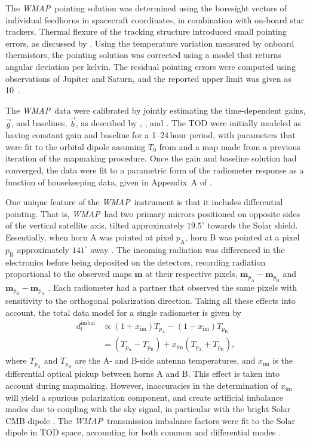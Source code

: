 \documentclass[twocolumn]{../../common/aa}
\def\WMAP{\emph{WMAP}}
\newcommand{\A}[0]{\mathrm{A}}
\newcommand{\B}[0]{\mathrm{B}}
\newcommand{\bv}[0]{\vec{b}}
\newcommand{\g}[0]{\vec{g}}
\begin{document}
The \WMAP\ pointing solution was determined using the boresight vectors of individual feedhorns in spacecraft coordinates, in combination with on-board star trackers. Thermal flexure of the tracking structure introduced small pointing errors, as discussed by \citet{jarosik2007}. Using the temperature variation measured by onboard thermistors, the pointing solution was corrected using a model that returns angular deviation per kelvin. The residual pointing errors were computed using observations of Jupiter and Saturn, and the reported upper limit was given as 10\arcsec\ \citep{wmapexsupp,bennett2012}.

The \WMAP\ data were calibrated by jointly estimating the time-dependent gains, $\g$, and baselines, $\bv$, as described by \citet{hinshaw2007}, \citet{hinshaw2009}, and \citet{jarosik2010}.
The TOD were initially modeled as having
constant gain and baseline for a 1--24\,hour period, with parameters that were fit to the orbital
dipole assuming $T_0$ from \citet{mather:1999} and a map made from a previous
iteration of the mapmaking procedure. Once the gain and baseline solution had
converged, the data were fit to a parametric form of the radiometer response
as a function of housekeeping data, given in Appendix~A of \citet{wmapexsupp}.

One unique feature of the \WMAP\ instrument is that it includes differential pointing. That is, \WMAP\ had two primary mirrors positioned on opposite sides of the vertical satellite axis, tilted approximately $19.5^\circ$ towards the Solar shield. Essentially, when horn A was pointed at pixel $p_\A$, horn B was pointed at a pixel $p_\B$ approximately $141^\circ$ away \citep{page2003:MAP}. The incoming radiation was differenced in the electronics before being deposited on the detectors, recording radiation proportional to the observed maps $\boldsymbol m$ at their respective pixels, $\boldsymbol m_{p_\A}-\boldsymbol m_{p_\B}$ and $\boldsymbol m_{p_\B}-\boldsymbol m_{p_\A}$ \citep{jarosik2003:MAP}. Each radiometer had a partner that observed the same pixels with sensitivity to the orthogonal polarization direction. Taking all these effects into account, the total data model for a single radiometer is given by
\begin{align}
	d_t^\mathrm{imbal}&\propto (1+x_\mathrm{im})T_{p_\A}-(1-x_\mathrm{im})T_{p_\B}
	\\
	&=(T_{p_\A}-T_{p_\B})+x_\mathrm{im}(T_{p_\A}+T_{p_\B}),
\end{align}
where $T_{p_\A}$ and $T_{p_\B}$ are the A- and B-side antenna temperatures, and $x_\mathrm{im}$ is the differential optical pickup between horns A and B. This effect is taken into account during mapmaking. However, inaccuracies in the determination of $x_\mathrm{im}$ will yield a spurious polarization component, and create artificial imbalance modes due to coupling with the sky signal, in particular with the bright Solar CMB dipole \citep{jarosik2007}. The \WMAP\ transmission imbalance factors were fit to the Solar dipole in TOD space, accounting for both common and differential modes \citep{jarosik2003a,jarosik2007}.
\end{document}

